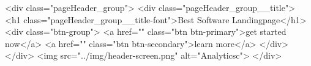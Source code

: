 <div class="pageHeader_group">
    <div class="pageHeader_group__title">
        <h1 class="pageHeader_group__title-font">Best Software Landingpage</h1>
        <div class="btn-group">
            <a href="" class="btn btn-primary">get started now</a>
            <a href="" class="btn btn-secondary">learn more</a>
        </div>        
    </div>
    <img src="../img/header-screen.png" alt="Analyticsc">
</div>